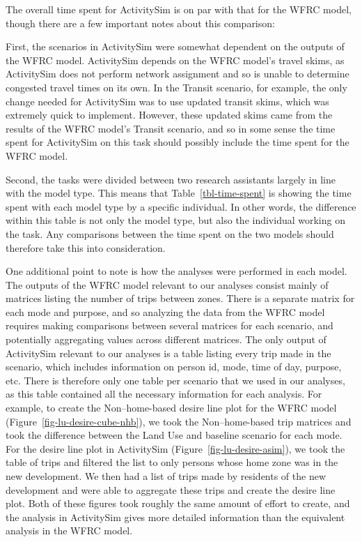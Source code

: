 \documentclass[fancy, oneside, mastersfancy, ms]{byuthesis}
\begin{document}
The overall time spent for ActivitySim is on par with that for the WFRC
model, though there are a few important notes about this comparison:

First, the scenarios in ActivitySim were somewhat dependent on the
outputs of the WFRC model. ActivitySim depends on the WFRC model's
travel skims, as ActivitySim does not perform network assignment and so
is unable to determine congested travel times on its own. In the Transit
scenario, for example, the only change needed for ActivitySim was to use
updated transit skims, which was extremely quick to implement. However,
these updated skims came from the results of the WFRC model's Transit
scenario, and so in some sense the time spent for ActivitySim on this
task should possibly include the time spent for the WFRC model.

Second, the tasks were divided between two research assistants largely
in line with the model type. This means that Table~\ref{tbl-time-spent}
is showing the time spent with each model type by a specific individual.
In other words, the difference within this table is not only the model
type, but also the individual working on the task. Any comparisons
between the time spent on the two models should therefore take this into
consideration.

One additional point to note is how the analyses were performed in each
model. The outputs of the WFRC model relevant to our analyses consist
mainly of matrices listing the number of trips between zones. There is a
separate matrix for each mode and purpose, and so analyzing the data
from the WFRC model requires making comparisons between several matrices
for each scenario, and potentially aggregating values across different
matrices. The only output of ActivitySim relevant to our analyses is a
table listing every trip made in the scenario, which includes
information on person id, mode, time of day, purpose, etc. There is
therefore only one table per scenario that we used in our analyses, as
this table contained all the necessary information for each analysis.
For example, to create the Non--home-based desire line plot for the WFRC
model (Figure~\ref{fig-lu-desire-cube-nhb}), we took the Non--home-based
trip matrices and took the difference between the Land Use and baseline
scenario for each mode. For the desire line plot in ActivitySim
(Figure~\ref{fig-lu-desire-asim}), we took the table of trips and
filtered the list to only persons whose home zone was in the new
development. We then had a list of trips made by residents of the new
development and were able to aggregate these trips and create the desire
line plot. Both of these figures took roughly the same amount of effort
to create, and the analysis in ActivitySim gives more detailed
information than the equivalent analysis in the WFRC model.
\end{document}

